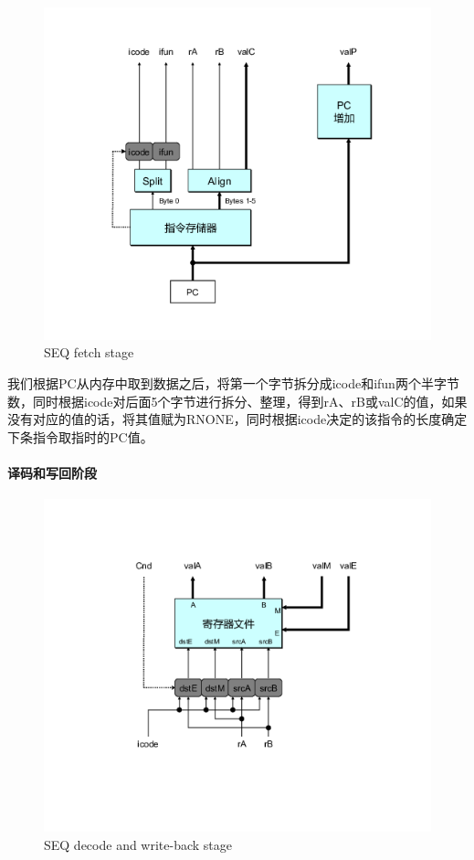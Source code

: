 \begin{figure}[htbp]
\centering
\includegraphics{img/seq-fetch.png}
\caption{SEQ fetch stage}
\end{figure}

我们根据PC从内存中取到数据之后，将第一个字节拆分成icode和ifun两个半字节数，同时根据icode对后面5个字节进行拆分、整理，得到rA、rB或valC的值，如果没有对应的值的话，将其值赋为RNONE，同时根据icode决定的该指令的长度确定下条指令取指时的PC值。

\paragraph{译码和写回阶段}\label{ux8bd1ux7801ux548cux5199ux56deux9636ux6bb5}

\begin{figure}[htbp]
\centering
\includegraphics{img/seq-decode.png}
\caption{SEQ decode and write-back stage}
\end{figure}

